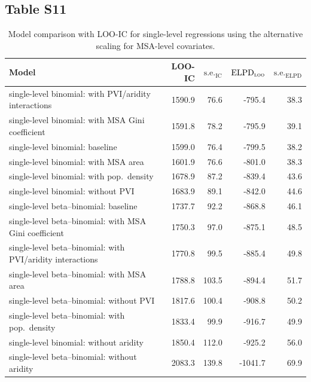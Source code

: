 \documentclass[draft]{agujournal}\usepackage{knitr}
\begin{document}
\subsection*{Table S11}
\begin{table}[H]
\centering
\begingroup\small
\begin{tabular}{p{3in}rrrr}
  \hline
Model & LOO-IC & $\text{s.e.}_{\text{IC}}$ & $\text{ELPD}_{\text{\scshape{loo}}}$ & $\text{s.e.}_{\text{ELPD}}$ \\ 
  \hline
single-level binomial: with PVI/aridity interactions & 1590.9 & 76.6 & -795.4 & 38.3 \\ 
  single-level binomial: with MSA Gini coefficient & 1591.8 & 78.2 & -795.9 & 39.1 \\ 
  single-level binomial: baseline & 1599.0 & 76.4 & -799.5 & 38.2 \\ 
  single-level binomial: with MSA area & 1601.9 & 76.6 & -801.0 & 38.3 \\ 
  single-level binomial: with pop.\ density & 1678.9 & 87.2 & -839.4 & 43.6 \\ 
  single-level binomial: without PVI & 1683.9 & 89.1 & -842.0 & 44.6 \\ 
  single-level beta--binomial: baseline & 1737.7 & 92.2 & -868.8 & 46.1 \\ 
  single-level beta--binomial: with MSA Gini coefficient & 1750.3 & 97.0 & -875.1 & 48.5 \\ 
  single-level beta--binomial: with PVI/aridity interactions & 1770.8 & 99.5 & -885.4 & 49.8 \\ 
  single-level beta--binomial: with MSA area & 1788.8 & 103.5 & -894.4 & 51.7 \\ 
  single-level beta--binomial: without PVI & 1817.6 & 100.4 & -908.8 & 50.2 \\ 
  single-level beta--binomial: with pop.\ density & 1833.4 & 99.9 & -916.7 & 49.9 \\ 
  single-level binomial: without aridity & 1850.4 & 112.0 & -925.2 & 56.0 \\ 
  single-level beta--binomial: without aridity & 2083.3 & 139.8 & -1041.7 & 69.9 \\ 
   \hline
\end{tabular}
\endgroup
\caption[Model comparison: LOO (alternate covariates using alternative scaling) for single-level.]{Model comparison with LOO-IC for single-level regressions using the alternative scaling for MSA-level covariates.} 
\label{tab:loo.vars}
\end{table}
\end{document}
